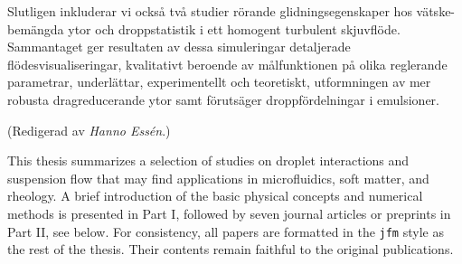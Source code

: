 \begin{abstrakt}
Slutligen inkluderar vi också två studier rörande glidningsegenskaper hos vätske-bemängda ytor och droppstatistik i ett homogent turbulent skjuvflöde. Sammantaget ger resultaten av dessa simuleringar detaljerade flödesvisualiseringar, kvalitativt beroende av målfunktionen på olika reglerande parametrar,
underlättar, experimentellt och teoretiskt, utformningen av mer robusta dragreducerande ytor samt förutsäger droppfördelningar i emulsioner.

\noindent
{\small (Redigerad av {\it Hanno Essén}.)}
%
%
\end{abstrakt}


%
\begin{preface}
	This thesis summarizes a selection of studies on droplet interactions and suspension flow
        that may find applications in microfluidics, soft matter, and rheology.
        A brief introduction of the basic physical concepts and numerical methods is presented in Part I,
        followed by seven journal articles or preprints in Part II, see below.
        For consistency, all papers are formatted in the \texttt{jfm} style as the rest of the thesis.
        Their contents remain faithful to the original publications.
\end{preface}


